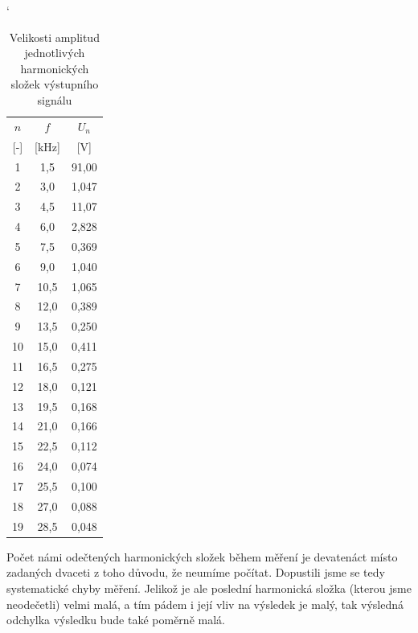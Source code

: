 \documentclass[a4paper, czech]{article}
\begin{document}
\begin{table}[H]
    \catcode`
    \centering
    \caption{Velikosti amplitud jednotlivých harmonických složek výstupního signálu}
    \begin{tabular}{ccc}
        \toprule
        $n$       & $f$         & $U_n$      \\
        \cmidrule(rl){1-3}
        [-]       & [kHz]       & [V]        \\
        \midrule
        1         & 1,5         & 91,00      \\
        2         & 3,0         & 1,047      \\
        3         & 4,5         & 11,07      \\
        4         & 6,0         & 2,828      \\
        5         & 7,5         & 0,369      \\
        6         & 9,0         & 1,040      \\
        7         & 10,5        & 1,065      \\
        8         & 12,0        & 0,389      \\
        9         & 13,5        & 0,250      \\
        10        & 15,0        & 0,411      \\
        11        & 16,5        & 0,275      \\
        12        & 18,0        & 0,121      \\
        13        & 19,5        & 0,168      \\
        14        & 21,0        & 0,166      \\
        15        & 22,5        & 0,112      \\
        16        & 24,0        & 0,074      \\
        17        & 25,5        & 0,100      \\
        18        & 27,0        & 0,088      \\
        19        & 28,5        & 0,048      \\
        \bottomrule
    \end{tabular}
\end{table}

Počet námi odečtených harmonických složek během měření je devatenáct místo zadaných dvaceti z toho důvodu, že neumíme počítat.
Dopustili jsme se tedy systematické chyby měření.
Jelikož je ale poslední harmonická složka (kterou jsme neodečetli) velmi malá, a tím pádem i její vliv na výsledek je malý, tak výsledná odchylka výsledku bude také poměrně malá.
\end{document}
